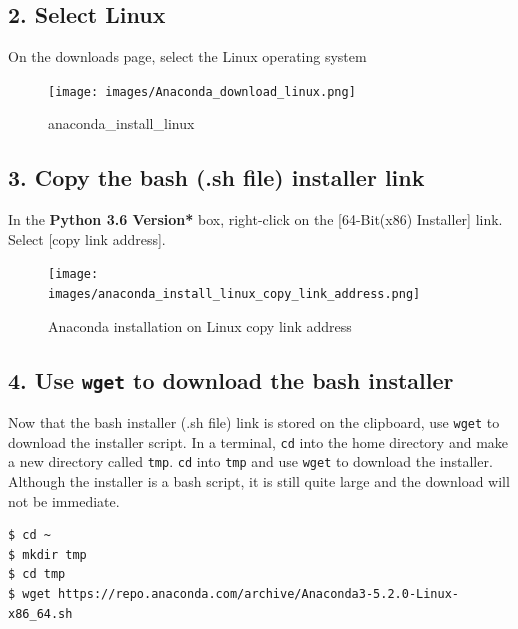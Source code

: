 \documentclass{book}
\begin{document}
    
        \subsection{2. Select Linux}\label{select-linux}

On the downloads page, select the Linux operating system

\begin{figure}
\centering
\texttt{[image: images/Anaconda\_download\_linux.png]}
\caption{anaconda\_install\_linux}
\end{figure}
    




    
        \subsection{3. Copy the bash (.sh file) installer
link}\label{copy-the-bash-.sh-file-installer-link}

In the \textbf{Python 3.6 Version* } box, right-click on the
{[}64-Bit(x86) Installer{]} link. Select {[}copy link address{]}.

\begin{figure}
\centering
\texttt{[image: images/anaconda\_install\_linux\_copy\_link\_address.png]}
\caption{Anaconda installation on Linux copy link address}
\end{figure}
    




    
        \subsection{\texorpdfstring{4. Use \texttt{wget} to download the bash
installer}{4. Use wget to download the bash installer}}\label{use-wget-to-download-the-bash-installer}

Now that the bash installer (.sh file) link is stored on the clipboard,
use \lstinline!wget! to download the installer script. In a terminal,
\lstinline!cd! into the home directory and make a new directory called
\lstinline!tmp!. \lstinline!cd! into \lstinline!tmp! and use
\lstinline!wget! to download the installer. Although the installer is a
bash script, it is still quite large and the download will not be
immediate.

\begin{lstlisting}
$ cd ~
$ mkdir tmp
$ cd tmp
$ wget https://repo.anaconda.com/archive/Anaconda3-5.2.0-Linux-x86_64.sh 
\end{lstlisting}
    
\end{document}
